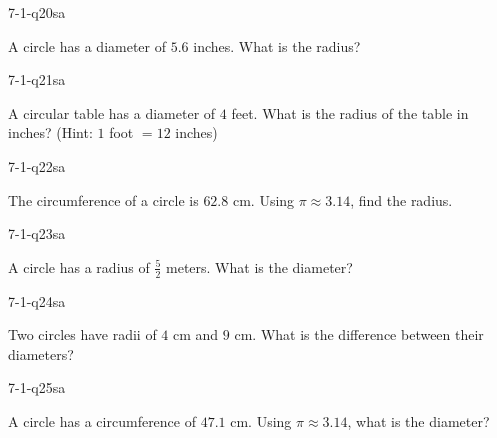 \begin{practiceQuestion}{7-1-q20}{sa}
\begin{questionText}
A circle has a diameter of $5.6$ inches. What is the radius?
\end{questionText}
\end{practiceQuestion}

\begin{practiceQuestion}{7-1-q21}{sa}
\begin{questionText}
A circular table has a diameter of $4$ feet. What is the radius of the table in inches? (Hint: $1$ foot $= 12$ inches)
\end{questionText}
\end{practiceQuestion}

\begin{practiceQuestion}{7-1-q22}{sa}
\begin{questionText}
The circumference of a circle is $62.8$ cm. Using $\pi \approx 3.14$, find the radius.
\end{questionText}
\end{practiceQuestion}

\begin{practiceQuestion}{7-1-q23}{sa}
\begin{questionText}
A circle has a radius of $\frac{5}{2}$ meters. What is the diameter?
\end{questionText}
\end{practiceQuestion}

\begin{practiceQuestion}{7-1-q24}{sa}
\begin{questionText}
Two circles have radii of $4$ cm and $9$ cm. What is the difference between their diameters?
\end{questionText}
\end{practiceQuestion}

\begin{practiceQuestion}{7-1-q25}{sa}
\begin{questionText}
A circle has a circumference of $47.1$ cm. Using $\pi \approx 3.14$, what is the diameter?
\end{questionText}
\end{practiceQuestion}


